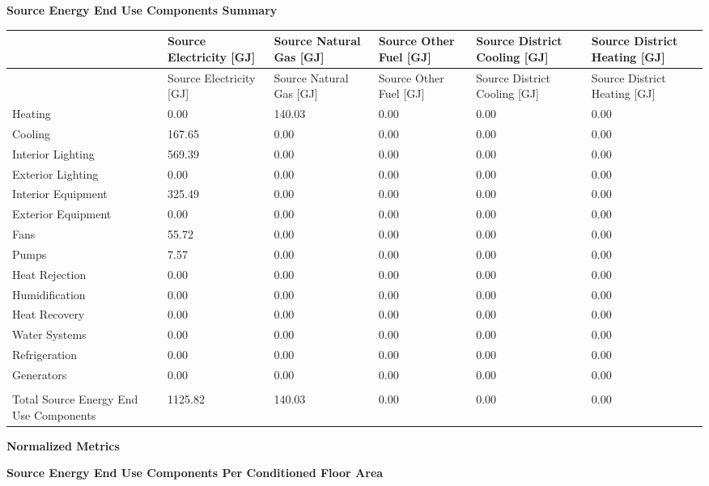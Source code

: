 \textbf{Source Energy End Use Components Summary}

{\scriptsize
\begin{longtable}[c]{>{\raggedright}p{1.0in}>{\raggedright}p{1.0in}>{\raggedright}p{1.0in}>{\raggedright}p{1.0in}>{\raggedright}p{1.0in}>{\raggedright}p{1.0in}}
\toprule 
 & Source Electricity [GJ] & Source Natural Gas [GJ] & Source Other Fuel [GJ] & Source District Cooling [GJ] & Source District Heating [GJ] \tabularnewline
\midrule
\endfirsthead

\toprule 
 & Source Electricity [GJ] & Source Natural Gas [GJ] & Source Other Fuel [GJ] & Source District Cooling [GJ] & Source District Heating [GJ] \tabularnewline
\midrule
\endhead

Heating & 0.00 & 140.03 & 0.00 & 0.00 & 0.00 \tabularnewline
Cooling & 167.65 & 0.00 & 0.00 & 0.00 & 0.00 \tabularnewline
Interior Lighting & 569.39 & 0.00 & 0.00 & 0.00 & 0.00 \tabularnewline
Exterior Lighting & 0.00 & 0.00 & 0.00 & 0.00 & 0.00 \tabularnewline
Interior Equipment & 325.49 & 0.00 & 0.00 & 0.00 & 0.00 \tabularnewline
Exterior Equipment & 0.00 & 0.00 & 0.00 & 0.00 & 0.00 \tabularnewline
Fans & 55.72 & 0.00 & 0.00 & 0.00 & 0.00 \tabularnewline
Pumps & 7.57 & 0.00 & 0.00 & 0.00 & 0.00 \tabularnewline
Heat Rejection & 0.00 & 0.00 & 0.00 & 0.00 & 0.00 \tabularnewline
Humidification & 0.00 & 0.00 & 0.00 & 0.00 & 0.00 \tabularnewline
Heat Recovery & 0.00 & 0.00 & 0.00 & 0.00 & 0.00 \tabularnewline
Water Systems & 0.00 & 0.00 & 0.00 & 0.00 & 0.00 \tabularnewline
Refrigeration & 0.00 & 0.00 & 0.00 & 0.00 & 0.00 \tabularnewline
Generators & 0.00 & 0.00 & 0.00 & 0.00 & 0.00 \tabularnewline
 &  &  &  &  &  \tabularnewline
Total Source Energy End Use Components & 1125.82 & 140.03 & 0.00 & 0.00 & 0.00 \tabularnewline
\bottomrule
\end{longtable}}

\textbf{Normalized Metrics}

\textbf{Source Energy End Use Components Per Conditioned Floor Area}

